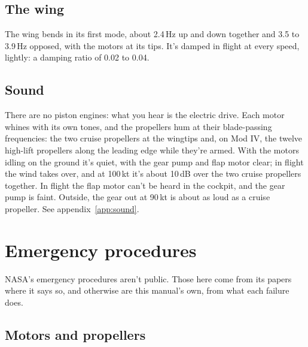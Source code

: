 \documentclass[11pt,a4paper,oneside]{book}
\begin{document}
\section{The wing}
The wing bends in its first mode, about 2.4\,Hz up and down together and 3.5 to 3.9\,Hz opposed, with the motors at its tips. It's damped in flight at every speed, lightly: a damping ratio of 0.02 to 0.04.

\section{Sound}
There are no piston engines: what you hear is the electric drive. Each motor whines with its own tones, and the propellers hum at their blade-passing frequencies: the two cruise propellers at the wingtips and, on Mod IV, the twelve high-lift propellers along the leading edge while they're armed. With the motors idling on the ground it's quiet, with the gear pump and flap motor clear; in flight the wind takes over, and at 100\,kt it's about 10\,dB over the two cruise propellers together. In flight the flap motor can't be heard in the cockpit, and the gear pump is faint. Outside, the gear out at 90\,kt is about as loud as a cruise propeller. See appendix~\ref{app:sound}.

\chapter{Emergency procedures}
NASA's emergency procedures aren't public. Those here come from its papers where it says so, and otherwise are this manual's own, from what each failure does.
\section{Motors and propellers}
\end{document}
